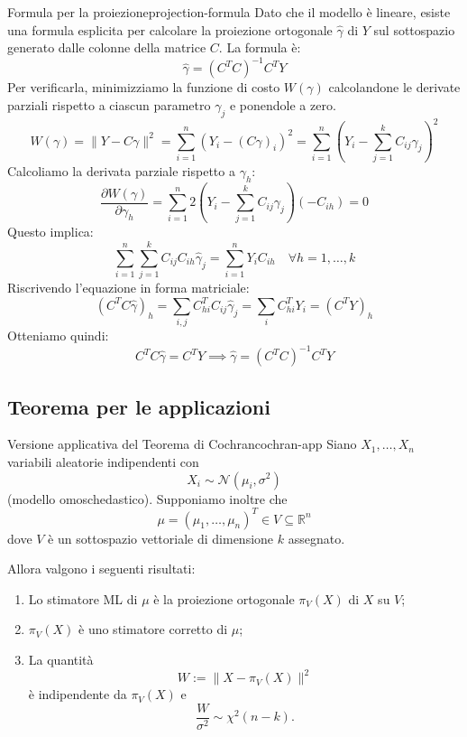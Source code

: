 \begin{dimostrazione}{Formula per la proiezione}{projection-formula}
Dato che il modello è lineare, esiste una formula esplicita per calcolare la proiezione ortogonale $\hat{\gamma}$ di $Y$ sul sottospazio generato dalle colonne della matrice $C$.
La formula è:
\[
\hat{\gamma} = (C^T C)^{-1} C^T Y
\]
Per verificarla, minimizziamo la funzione di costo $W(\gamma)$ calcolandone le derivate parziali rispetto a ciascun parametro $\gamma_j$ e ponendole a zero.
\[
W(\gamma) = \| Y - C\gamma \|^2 = \sum_{i=1}^{n} \left(Y_i - (C\gamma)_i\right)^2 = \sum_{i=1}^{n} \left(Y_i - \sum_{j=1}^{k} C_{ij}\gamma_j\right)^2
\]
Calcoliamo la derivata parziale rispetto a $\gamma_h$:
\[
\frac{\partial W(\gamma)}{\partial \gamma_h} = \sum_{i=1}^{n} 2 \left(Y_i - \sum_{j=1}^{k} C_{ij}\gamma_j\right) (-C_{ih}) = 0
\]
Questo implica:
\[
\sum_{i=1}^{n} \sum_{j=1}^{k} C_{ij} C_{ih} \hat{\gamma}_j = \sum_{i=1}^{n} Y_i C_{ih} \quad \forall h=1, \dots, k
\]
Riscrivendo l'equazione in forma matriciale:
\[
(C^T C \hat{\gamma})_h = \sum_{i,j} C^T_{hi} C_{ij} \hat{\gamma}_j = \sum_{i} C^T_{hi} Y_i = (C^T Y)_h
\]
Otteniamo quindi:
\[
C^T C \hat{\gamma} = C^T Y \implies \hat{\gamma} = (C^T C)^{-1} C^T Y
\]
\end{dimostrazione}

\subsection{Teorema per le applicazioni}
\begin{teorema}{Versione applicativa del Teorema di Cochran}{cochran-app}
Siano $X_1, \dots, X_n$ variabili aleatorie indipendenti con
\[
X_i \sim \mathcal{N}(\mu_i, \sigma^2)
\]
(modello omoschedastico). Supponiamo inoltre che
\[
\mu = (\mu_1, \dots, \mu_n)^T \in V \subseteq \mathbb{R}^n
\]
dove $V$ è un sottospazio vettoriale di dimensione $k$ assegnato.

Allora valgono i seguenti risultati:
\begin{enumerate}
  \item Lo stimatore ML di $\mu$ è la proiezione ortogonale
        $\pi_V(X)$ di $X$ su $V$;
  \item $\pi_V(X)$ è uno stimatore corretto di $\mu$;
  \item La quantità
        \[
        W := \| X - \pi_V(X) \|^2
        \]
        è indipendente da $\pi_V(X)$ e
        \[
        \frac{W}{\sigma^2} \sim \chi^2(n - k).
        \]
\end{enumerate}
\end{teorema}

